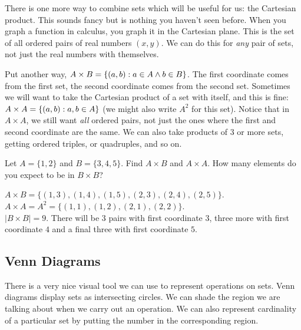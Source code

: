 \documentclass[12pt]{article}
\begin{document}
There is one more way to combine sets which will be useful for us: the Cartesian product.  This sounds fancy but is nothing you haven't seen before.  When you graph a function in calculus, you graph it in the Cartesian plane.  This is the set of all ordered pairs of real numbers $(x,y)$.  We can do this for \emph{any} pair of sets, not just the real numbers with themselves.

Put another way, $A \times B = \{(a,b) : a \in A \wedge b \in B\}$.  The first coordinate comes from the first set, the second coordinate comes from the second set.  Sometimes we will want to take the Cartesian product of a set with itself, and this is fine: $A \times A = \{(a,b) : a, b \in A\}$ (we might also write $A^2$ for this set).  Notice that in $A \times A$, we still want \emph{all} ordered pairs, not just the ones where the first and second coordinate are the same.  We can also take products of 3 or more sets, getting ordered triples, or quadruples, and so on.

\begin{example}
Let $A = \{1,2\}$ and $B = \{3,4,5\}$.  Find $A \times B$ and $A \times A$.  How many elements do you expect to be in $B \times B$?
\begin{solution}
$A \times B = \{(1,3), (1,4), (1,5), (2,3), (2,4), (2,5)\}$.  \\ $A \times A = A^2 = \{(1,1), (1,2), (2,1), (2,2)\}$. \\
$|B\times B| = 9$.  There will be 3 pairs with first coordinate $3$, three more with first coordinate $4$ and a final three with first coordinate $5$.
\end{solution}
\end{example}
%
%

\subsection{Venn Diagrams}
There is a very nice visual tool we can use to represent operations on sets.  Venn diagrams display sets as intersecting circles.  We can shade the region we are talking about when we carry out an operation.  We can also represent cardinality of a particular set by putting the number in the corresponding region.
\end{document}
